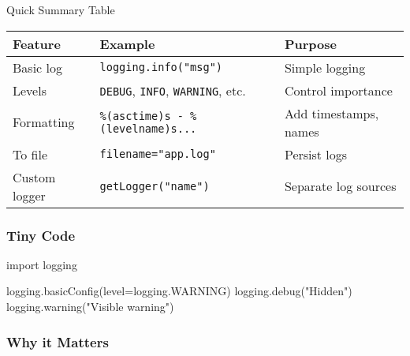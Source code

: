 \documentclass[
  letterpaper,
  DIV=11,
  numbers=noendperiod]{scrreprt}
\newenvironment{Shaded}{\begin{snugshade}}{\end{snugshade}}
\newcommand{\ImportTok}[1]{\textcolor[rgb]{0.00,0.46,0.62}{#1}}
\newcommand{\NormalTok}[1]{\textcolor[rgb]{0.00,0.23,0.31}{#1}}
\newcommand{\OperatorTok}[1]{\textcolor[rgb]{0.37,0.37,0.37}{#1}}
\newcommand{\StringTok}[1]{\textcolor[rgb]{0.13,0.47,0.30}{#1}}
\begin{document}
Quick Summary Table

\begin{longtable}[]{@{}
  >{\raggedright\arraybackslash}p{}
  >{\raggedright\arraybackslash}p{}
  >{\raggedright\arraybackslash}p{}@{}}
\toprule\noalign{}
\begin{minipage}[b]{\linewidth}\raggedright
Feature
\end{minipage} & \begin{minipage}[b]{\linewidth}\raggedright
Example
\end{minipage} & \begin{minipage}[b]{\linewidth}\raggedright
Purpose
\end{minipage} \\
\midrule\noalign{}
\endhead
\bottomrule\noalign{}
\endlastfoot
Basic log & \texttt{logging.info("msg")} & Simple logging \\
Levels & \texttt{DEBUG}, \texttt{INFO}, \texttt{WARNING}, etc. & Control
importance \\
Formatting & \texttt{\%(asctime)s\ -\ \%(levelname)s...} & Add
timestamps, names \\
To file & \texttt{filename="app.log"} & Persist logs \\
Custom logger & \texttt{getLogger("name")} & Separate log sources \\
\end{longtable}

\subsubsection{Tiny Code}\label{tiny-code-92}

\begin{Shaded}
\begin{Highlighting}[]
\ImportTok{import}\NormalTok{ logging}

\NormalTok{logging.basicConfig(level}\OperatorTok{=}\NormalTok{logging.WARNING)}
\NormalTok{logging.debug(}\StringTok{"Hidden"}\NormalTok{)}
\NormalTok{logging.warning(}\StringTok{"Visible warning"}\NormalTok{)}
\end{Highlighting}
\end{Shaded}

\subsubsection{Why it Matters}\label{why-it-matters-92}
\end{document}
